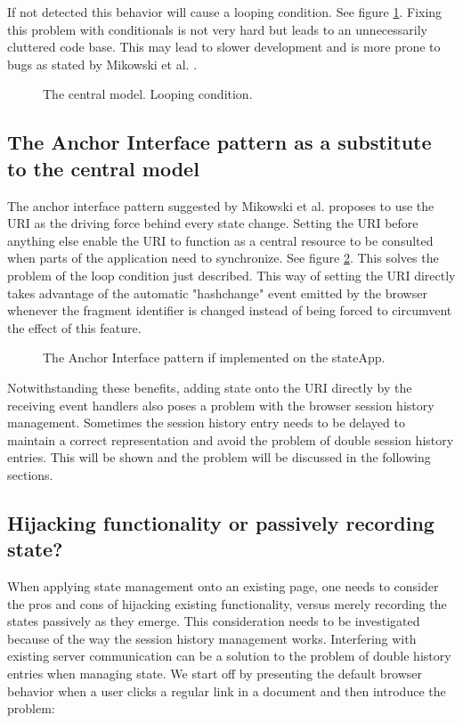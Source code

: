 \documentclass[english]{ifimaster}
\begin{document}
If not detected this behavior will cause a looping condition. See figure \ref{fig:centralModelLoop}. Fixing this problem with conditionals is not very hard but leads to an unnecessarily cluttered code base. This may lead to slower development and is more prone to bugs as stated by Mikowski et al. \parencite[86]{mikowski}.

\begin{figure}
\centering

\caption{The central model. Looping condition.} \label{fig:centralModelLoop}

\end{figure}

\subsection{The Anchor Interface pattern as a substitute to the central model} 
The anchor interface pattern suggested by Mikowski et al. proposes to use the URI as the driving force behind every state change. Setting the URI before anything else enable the URI to function as a central resource to be consulted when parts of the application need to synchronize. See figure \ref{fig:anchorInterface}. This solves the problem of the loop condition just described. This way of setting the URI directly takes advantage of the automatic "hashchange" event emitted by the browser whenever the fragment identifier is changed instead of being forced to circumvent the effect of this feature.

\begin{figure}
\centering

\caption{The Anchor Interface pattern if implemented on the stateApp.} \label{fig:anchorInterface}

\end{figure}
Notwithstanding these benefits, adding state onto the URI directly by the receiving event handlers also poses a problem with the browser session history management. Sometimes the session history entry needs to be delayed to maintain a correct representation and avoid the problem of double session history entries. This will be shown and the problem will be discussed in the following sections.

\subsection{Hijacking functionality or passively recording state?}
\label{sec:hijackOrRecord}
When applying state management onto an existing page, one needs to consider the pros and cons of hijacking existing functionality, versus merely recording the states passively as they emerge. This consideration needs to be investigated because of the way the session history management works. Interfering with existing server communication can be a solution to the problem of double history entries when managing state. We start off by presenting the default browser behavior when a user clicks a regular link in a document and then introduce the problem: 
\end{document}
